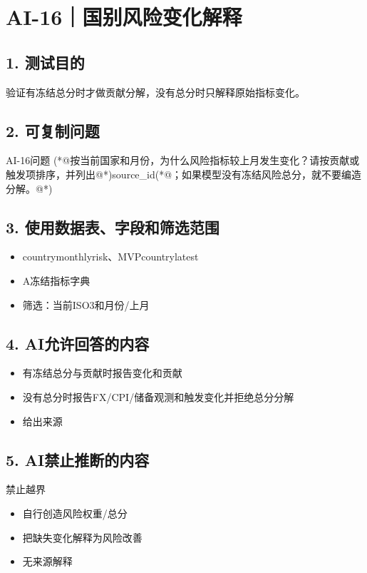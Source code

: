 \documentclass[UTF8,openany,zihao=-4]{ctexbook}
\renewcommand{\_}{\textunderscore\allowbreak}
\begin{document}
\clearpage
\section{AI-16｜国别风险变化解释}
\subsection*{1. 测试目的}
验证有冻结总分时才做贡献分解，没有总分时只解释原始指标变化。


\subsection*{2. 可复制问题}
\begin{PromptBox}{AI-16问题}
(*@{\promptcjk 按当前国家和月份，为什么风险指标较上月发生变化？请按贡献或触发项排序，并列出}@*)source_id(*@{\promptcjk ；如果模型没有冻结风险总分，就不要编造分解。}@*)
\end{PromptBox}

\subsection*{3. 使用数据表、字段和筛选范围}
\begin{itemize}
\item country\_monthly\_risk、MVP\_country\_latest
\item A冻结指标字典
\item 筛选：当前ISO3和月份/上月
\end{itemize}

\subsection*{4. AI允许回答的内容}
\begin{itemize}
\item 有冻结总分与贡献时报告变化和贡献
\item 没有总分时报告FX/CPI/储备观测和触发变化并拒绝总分分解
\item 给出来源
\end{itemize}

\subsection*{5. AI禁止推断的内容}
\begin{dangerbox}{禁止越界}
\begin{itemize}
\item 自行创造风险权重/总分
\item 把缺失变化解释为风险改善
\item 无来源解释
\end{itemize}
\end{dangerbox}
\end{document}
